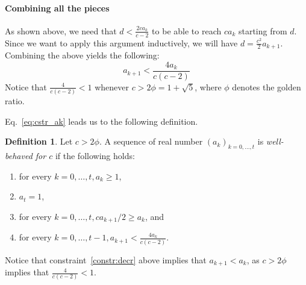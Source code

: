 \documentclass[a4paper, 11pt]{article}
\theoremstyle{plain}
\theoremstyle{definition}
\newtheorem{definition}[theorem]{Definition}
\theoremstyle{remark}
\begin{document}
\paragraph{Combining all the pieces}
As shown above, we need that $d < \frac{2ca_k}{c-2}$ 
to be able to reach $ca_k$ starting from $d$.
Since we want to apply this argument inductively, we will have 
$d = \frac{c^2}{2}a_{k+1}$.
Combining the above yields the following:
\begin{equation}
	a_{k+1} < \frac{4a_k}{c(c-2)} \label{eq:cstr_ak}
\end{equation}
Notice that $\frac{4}{c(c-2)} < 1$ whenever $c > 2\phi = 1 + \sqrt{5}$, 
where $\phi$ denotes the golden ratio.

Eq.~\ref{eq:cstr_ak} leads us to the following definition.
\begin{definition}
	Let $c > 2\phi$.
	A sequence of real number $(a_k)_{k=0,\ldots,t}$ is \textit{well-behaved for $c$}
	if the following holds:
	\begin{enumerate}
		\item for every $k=0,\ldots,t, a_k \ge 1$,
		\item $a_t = 1$,
		\item for every $k=0,\ldots,t, c a_{k+1}/2  \ge a_k$, and
		\item\label{constr:decr} for every $k=0,\ldots,t-1, a_{k+1} < \frac{4a_k}{c(c-2)}$.
	\end{enumerate}
\end{definition}
Notice that constraint~\ref{constr:decr} above implies that $a_{k+1} < a_k$,
as $c > 2\phi$ implies that $\frac{4}{c(c-2)} < 1$.
\end{document}
